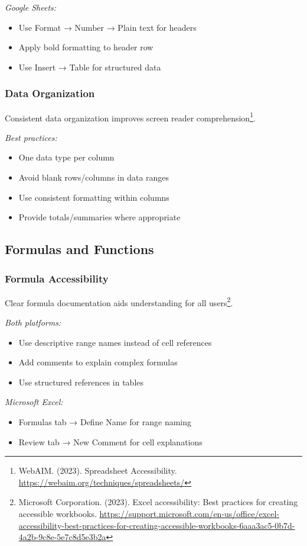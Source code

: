 \emph{Google Sheets:}
\begin{itemize}
\item Use Format → Number → Plain text for headers
\item Apply bold formatting to header row
\item Use Insert → Table for structured data
\end{itemize}

\subsubsection{Data Organization}
Consistent data organization improves screen reader comprehension\footnote{WebAIM. (2023). Spreadsheet Accessibility. \url{https://webaim.org/techniques/spreadsheets/}}.

\emph{Best practices:}
\begin{itemize}
\item One data type per column
\item Avoid blank rows/columns in data ranges
\item Use consistent formatting within columns
\item Provide totals/summaries where appropriate
\end{itemize}

\subsection{Formulas and Functions}

\subsubsection{Formula Accessibility}
Clear formula documentation aids understanding for all users\footnote{Microsoft Corporation. (2023). Excel accessibility: Best practices for creating accessible workbooks. \url{https://support.microsoft.com/en-us/office/excel-accessibility-best-practices-for-creating-accessible-workbooks-6aaa3ac5-0b7d-4a2b-9c8e-5e7c8d5e3b2a}}.

\emph{Both platforms:}
\begin{itemize}
\item Use descriptive range names instead of cell references
\item Add comments to explain complex formulas
\item Use structured references in tables
\end{itemize}

\emph{Microsoft Excel:}
\begin{itemize}
\item Formulas tab → Define Name for range naming
\item Review tab → New Comment for cell explanations
\end{itemize}

